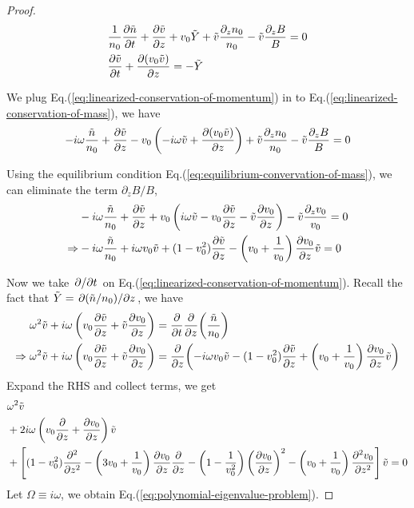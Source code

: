 \documentclass{article}
\theoremstyle{plain}
\theoremstyle{definition}
\theoremstyle{remark}
\theoremstyle{remark}
\begin{document}
\begin{proof}
    \begin{align*}
        &\frac{1}{n_0}\pdv{\tilde{n}}{t} 
        + \pdv{\tilde{v}}{z} + v_0\tilde{Y} + \tilde{v}\frac{\partial_z n_0}{n_0} - \tilde{v}\frac{\partial_z B}{B} = 0 
        \\
        &\pdv{\tilde{v}}{t} + \pdv{(v_0\tilde{v})}{z} = -\tilde{Y}
    \end{align*}


    We plug Eq.(\ref{eq:linearized-conservation-of-momentum}) in to Eq.(\ref{eq:linearized-conservation-of-mass}), we have 
    \[ -i\omega\frac{\tilde{n}}{n_0} 
    + \pdv{\tilde{v}}{z} - v_0\left(-i\omega\tilde{v} + \pdv{(v_0\tilde{v})}{z}\right) + \tilde{v}\frac{\partial_z n_0}{n_0} - \tilde{v}\frac{\partial_z B}{B} = 0 \]

    Using the equilibrium condition Eq.(\ref{eq:equilibrium-convervation-of-mass}), we can eliminate the term $\partial_z B/B$,
    \begin{align*}
    &-i\omega\frac{\tilde{n}}{n_0} 
    + \pdv{\tilde{v}}{z} 
    + v_0\left(i\omega \tilde{v} - v_0\pdv{\tilde{v}}{z} - \tilde{v}\pdv{v_0}{z} \right)
    - \tilde{v}\frac{\partial_z v_0}{v_0} = 0\\
    \Rightarrow
    &-i\omega\frac{\tilde{n}}{n_0} 
    + i\omega v_0\tilde{v}
    + (1-v_0^2)\pdv{\tilde{v}}{z} 
     - \left(v_0+\frac{1}{v_0}\right)\pdv{v_0}{z}\tilde{v} = 0
    \end{align*}

    Now we take $\pdv*{t}$ on Eq.(\ref{eq:linearized-conservation-of-momentum}). Recall the fact that $\tilde{Y} = \pdv*{(\tilde{n}/n_0)}{z}$, we have
    \begin{align*}
        \omega^2\tilde{v} + i\omega\left(v_0\pdv{\tilde{v}}{z} + \tilde{v}\pdv{v_0}{z}\right) &= \pdv{t}\pdv{z}(\frac{\tilde{n}}{n_0}) \\
        \Rightarrow
        \omega^2\tilde{v} + i\omega\left(v_0\pdv{\tilde{v}}{z} + \tilde{v}\pdv{v_0}{z}\right) &= \pdv{z}(-i\omega v_0\tilde{v}
        - (1-v_0^2)\pdv{\tilde{v}}{z} 
        + \left(v_0+\frac{1}{v_0}\right)\pdv{v_0}{z}\tilde{v})
    \end{align*}
    Expand the RHS and collect terms, we get
    \begin{align*}
        &\omega^2 \tilde{v} \\ 
        &+2i\omega\left(v_0\pdv{}{z} + \pdv{v_0}{z}\right) \tilde{v} \\ 
        &+\left[ (1-v_0^2)\pdv[2]{}{z} 
        -\left(3v_0 + \frac{1}{v_0}\right)\pdv{v_0}{z}\pdv{}{z} 
        - \left(1-\frac{1}{v_0^2}\right)\left(\pdv{v_0}{z}\right)^2 
        - \left(v_0+\frac{1}{v_0}\right)\pdv[2]{v_0}{z} \right]\tilde{v}
        = 0
    \end{align*}
    Let $\Omega \equiv i\omega$, we obtain Eq.(\ref{eq:polynomial-eigenvalue-problem}).
\end{proof}
\end{document}
